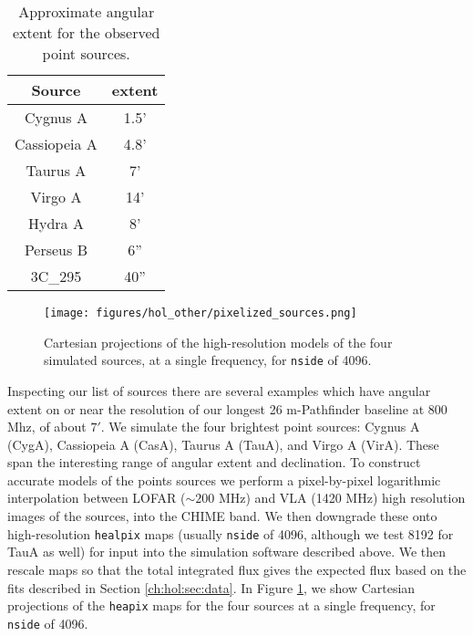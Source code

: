 \begin{table}[ht]
\caption{Approximate angular extent for the observed point sources.} 
\label{tab2}
\begin{center}
\begin{tabular}{| c  | c |}
\hline
 Source  & extent  \\ \hline
Cygnus A & 1.5' \\ \hline
Cassiopeia A & 4.8' \\ \hline
Taurus A & 7' \\ \hline
Virgo A & 14' \\ \hline
Hydra A & 8' \\ \hline
Perseus B  & 6'' \\ \hline
3C\_295 & 40'' \\ \hline
\end{tabular}
\end{center}
\end{table}

\begin{figure}[h!]
\begin{center}
\texttt{[image: figures/hol\_other/pixelized\_sources.png]}
\caption{Cartesian projections of the high-resolution models of the four simulated sources, at a single frequency, for \texttt{nside} of 4096.}
\label{pixelized_sources}
\end{center}
\end{figure} 

Inspecting our list of sources there are several examples which have angular extent on or near the resolution of our longest 26 m-Pathfinder baseline at 800 Mhz, of about $7'$. We simulate the four brightest point sources: Cygnus A (CygA), Cassiopeia A (CasA), Taurus A (TauA), and Virgo A (VirA). These span the interesting range of angular extent and declination. To construct accurate models of the points sources we perform a pixel-by-pixel logarithmic interpolation between LOFAR ($\sim 200$ MHz) and VLA (1420 MHz) high resolution images of the sources, into the CHIME band. We then downgrade these onto high-resolution \texttt{healpix} maps (usually \texttt{nside} of 4096, although we test 8192 for TauA as well) for input into the simulation software described above. We then rescale maps so that the total integrated flux gives the expected flux based on the fits described in Section \ref{ch:hol:sec:data}. In Figure \ref{pixelized_sources}, we show Cartesian projections of the \texttt{heapix} maps for the four sources at a single frequency, for \texttt{nside} of 4096.

